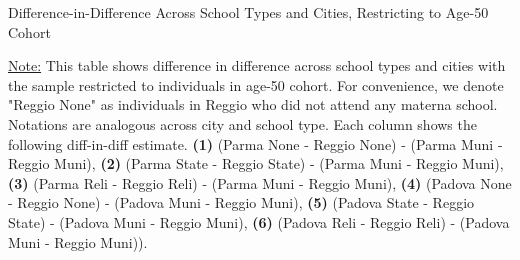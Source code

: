 \documentclass[11pt]{article}
\begin{document}
\begin{table}[H]
\begin{center}
	\caption{Difference-in-Difference Across School Types and Cities, Restricting to Age-50 Cohort} \label{table:NCh-50}
	\scalebox{0.80}{
		}
\end{center}
\footnotesize
\underline{Note:} This table shows difference in difference across school types and cities with the sample restricted to individuals in age-50 cohort. For convenience, we denote "Reggio None" as individuals in Reggio who did not attend any materna school. Notations are analogous across city and school type. Each column shows the following diff-in-diff estimate. \textbf{(1)} (Parma None - Reggio None) - (Parma Muni - Reggio Muni), \textbf{(2)} (Parma State - Reggio State) - (Parma Muni - Reggio Muni), \textbf{(3)} (Parma Reli - Reggio Reli) - (Parma Muni - Reggio Muni), \textbf{(4)} (Padova None - Reggio None) - (Padova Muni - Reggio Muni),  \textbf{(5)} (Padova State - Reggio State) - (Padova Muni - Reggio Muni), \textbf{(6)} (Padova Reli - Reggio Reli) - (Padova Muni - Reggio Muni)). 
\end{table}
\end{document}
